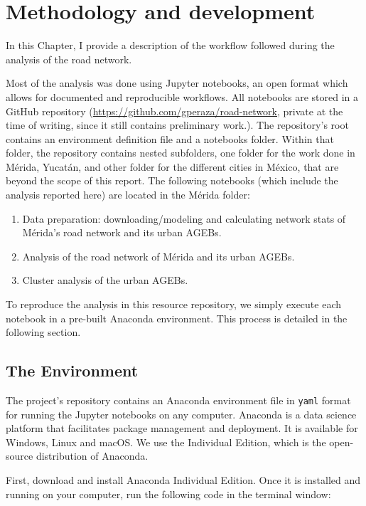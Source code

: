 \chapter{Methodology and development}
\label{cha:chapter3}

In this Chapter, I provide a description of the workflow followed during the analysis of the road network.

Most of the analysis was done using Jupyter notebooks, an open format which allows for documented and reproducible workflows. All notebooks are stored in a GitHub repository (\url{https://github.com/gperaza/road-network}, private at the time of writing, since it still contains preliminary work.). The repository's root contains an environment definition file and a notebooks folder. Within that folder, the repository contains nested subfolders, one folder for the work done in Mérida, Yucatán, and other folder for the different cities in México, that are beyond the scope of this report. The following notebooks (which include the analysis reported here) are located in the Mérida folder:

\begin{enumerate}
\item Data preparation: downloading/modeling and calculating network stats of Mérida's road network and its urban AGEBs.
\item Analysis of the road network of Mérida and its urban AGEBs.
\item Cluster analysis of the urban AGEBs.
\end{enumerate}

To reproduce the analysis in this resource repository, we simply execute each notebook in a pre-built Anaconda environment. This process is detailed in the following section.

\section{The Environment}

The project's repository contains an Anaconda environment file in \verb|yaml| format for running the Jupyter notebooks on any computer. Anaconda \cite{anaconda} is a data science platform that facilitates package management and deployment. It is available for Windows, Linux and macOS. We use the Individual Edition, which is the open-source distribution of Anaconda.

First, download and install Anaconda Individual Edition. Once it is installed and running on your computer, run the following code in the terminal window:

